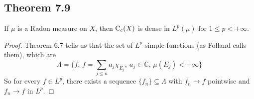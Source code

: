 \documentclass[../../main.tex]{subfiles}
\begin{document}
\subsection{Theorem 7.9}
\begin{wts}
    If $\mu$ is a Radon measure on $X$, then $\operatorname{C}_c({X})$ is dense in $L^p(\mu)$ for $1\leq p<+\infty$.
\end{wts}
\begin{proof}
    Theorem 6.7 tells us that the set of $L^p$ simple functions (as Folland calls them), which are
    \[
        \Lambda=\biggl\{f,\,f=\sum_{j\leq n}a_j\chi_{E_j},\:a_j\in\mathbb{C},\,\mu(E_j)<+\infty\biggr\}
    \]
    So for every $f\in L^p$, there exists a sequence $\{f_n\}\subseteq\Lambda$ with $f_n\to f$ pointwise and $f_n\to f$ in $L^p$.
\end{proof}
\end{document}
